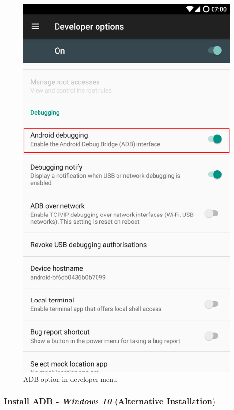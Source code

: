 \begin{figure}
  \centering
  \includegraphics[scale=0.1]{Images/adbDebuggingOption.png}
  \caption{ADB option in developer menu}
  \label{fig:adbOption}
\end{figure}

\subsubsection{\texorpdfstring{Install ADB - \emph{Windows 10}
(Alternative
Installation)}{Install ADB - Windows 10 (Alternative Installation)}}\label{install-adb---windows-10-alternative-installation}

